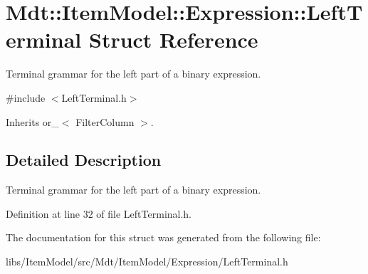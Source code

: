 \hypertarget{struct_mdt_1_1_item_model_1_1_expression_1_1_left_terminal}{}\section{Mdt\+:\+:Item\+Model\+:\+:Expression\+:\+:Left\+Terminal Struct Reference}
\label{struct_mdt_1_1_item_model_1_1_expression_1_1_left_terminal}


Terminal grammar for the left part of a binary expression.  




{\ttfamily \#include $<$Left\+Terminal.\+h$>$}



Inherits or\+\_\+$<$ Filter\+Column $>$.



\subsection{Detailed Description}
Terminal grammar for the left part of a binary expression. 

Definition at line 32 of file Left\+Terminal.\+h.



The documentation for this struct was generated from the following file\+:\begin{DoxyCompactItemize}
\item 
libs/\+Item\+Model/src/\+Mdt/\+Item\+Model/\+Expression/Left\+Terminal.\+h\end{DoxyCompactItemize}
